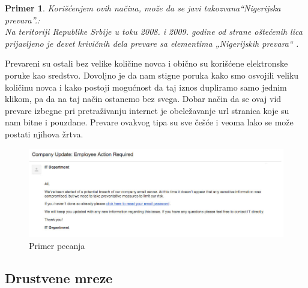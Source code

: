 \documentclass[a4paper]{article}
\newtheorem{primer}{Primer}[section]
\begin{document}
\begin{primer}
Korišćenjem ovih načina, može da se javi takozvana“Nigerijska prevara”.:\\Na teritoriji Republike Srbije u toku 2008. i 2009. godine od strane oštećenih lica prijavljeno je devet krivičnih dela prevare sa elementima „Nigerijskih prevara“ \cite{nig} .
\end{primer}
Prevareni su ostali bez velike količine novca i obično su korišćene elektronske poruke kao sredstvo. Dovoljno je da nam stigne poruka kako smo osvojili veliku količinu novca i kako postoji mogućnost da taj iznos dupliramo samo jednim klikom, pa da na taj način ostanemo bez svega. 
Dobar način da se ovaj vid prevare izbegne pri pretraživanju internet je obeležavanje url stranica koje su nam bitne  i pouzdane. Prevare ovakvog tipa su sve češće i veoma lako se može postati njihova žrtva.

\begin{figure}[h!]
\begin{center}
	\includegraphics[scale=0.5]{msnr_phishing.jpg}
\end{center}
\caption{Primer pecanja }
\label{fig:phishing}
\end{figure}


\subsection{Drustvene mreze}
\label{subsec:podnaslovIP3}
\end{document}
